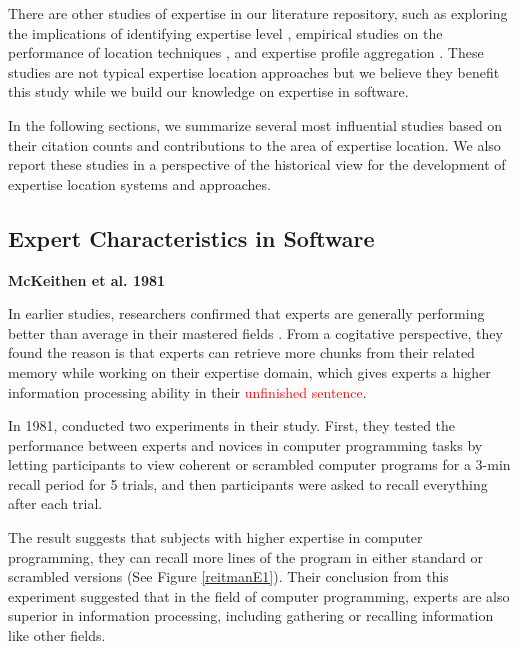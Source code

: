 There are other studies of expertise in our literature repository, such as exploring the implications of identifying expertise level \cite{chevalier2003web, klas2010transparent, chan2016improving}, empirical studies on the performance of location techniques \cite{hannebauer2016automatically}, and expertise profile aggregation \cite{hiring2016sarma, saxena2017know}. These studies are not typical expertise location approaches but we believe they benefit this study while we build our knowledge on expertise in software.

In the following sections, we summarize several most influential studies based on their citation counts and contributions to the area of expertise location. We also report these studies in a perspective of the historical view for the development of expertise location systems and approaches.

\subsection{Expert Characteristics in Software}

\textbf{McKeithen et al. 1981}

In earlier studies, researchers confirmed that experts are generally performing better than average in their mastered fields \cite{chase1973perception, de2008thought, gobet1996recall, Simon:1996:SA:237774}. From a cogitative perspective, they found the reason is that experts can retrieve more chunks from their related memory while working on their expertise domain, which gives experts a higher information processing ability in their \textcolor{red}{unfinished sentence}.

In 1981, \citeauthor{MCKEITHEN1981307} conducted two experiments in their study. First, they tested the performance between experts and novices in computer programming tasks by letting participants to view coherent or scrambled computer programs for a 3-min recall period for 5 trials, and then participants were asked to recall everything after each trial.

The result suggests that subjects with higher expertise in computer programming, they can recall more lines of the program in either standard or scrambled versions (See Figure \ref{reitmanE1}). Their conclusion from this experiment suggested that in the field of computer programming, experts are also superior in information processing, including gathering or recalling information like other fields.

